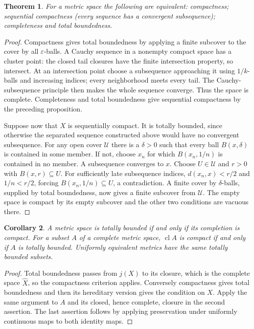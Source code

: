 \documentclass[11pt,oneside,openany]{book}
\newtheorem{theorem}{Theorem}[chapter]
\newtheorem{corollary}[theorem]{Corollary}
\theoremstyle{definition}
\theoremstyle{remark}
\newcommand{\eps}{\varepsilon}
\DeclareMathOperator{\cl}{cl}
\begin{document}
\begin{theorem}\label{d10:09:compact-equivalences}
For a metric space the following are equivalent: compactness; sequential compactness (every sequence has a convergent subsequence); completeness and total boundedness.
\end{theorem}
\begin{proof}
Compactness gives total boundedness by applying a finite subcover to the cover by all $\eps$-balls. A Cauchy sequence in a nonempty compact space has a cluster point: the closed tail closures have the finite intersection property, so intersect. At an intersection point choose a subsequence approaching it using $1/k$-balls and increasing indices; every neighborhood meets every tail. The Cauchy-subsequence principle then makes the whole sequence converge. Thus the space is complete. Completeness and total boundedness give sequential compactness by the preceding proposition.

Suppose now that $X$ is sequentially compact. It is totally bounded, since otherwise the separated sequence constructed above would have no convergent subsequence. For any open cover $\mathcal U$ there is a $\delta>0$ such that every ball $B(x,\delta)$ is contained in some member. If not, choose $x_n$ for which $B(x_n,1/n)$ is contained in no member. A subsequence converges to $x$. Choose $U\in\mathcal U$ and $r>0$ with $B(x,r)\subseteq U$. For sufficiently late subsequence indices, $d(x_n,x)<r/2$ and $1/n<r/2$, forcing $B(x_n,1/n)\subseteq U$, a contradiction. A finite cover by $\delta$-balls, supplied by total boundedness, now gives a finite subcover from $\mathcal U$. The empty space is compact by its empty subcover and the other two conditions are vacuous there.
\end{proof}

\begin{corollary}\label{d10:09:precompact-completion}
A metric space is totally bounded if and only if its completion is compact. For a subset $A$ of a complete metric space, $\cl A$ is compact if and only if $A$ is totally bounded. Uniformly equivalent metrics have the same totally bounded subsets.
\end{corollary}
\begin{proof}
Total boundedness passes from $j(X)$ to its closure, which is the complete space $\widehat X$, so the compactness criterion applies. Conversely compactness gives total boundedness and then its hereditary version gives the condition on $X$. Apply the same argument to $A$ and its closed, hence complete, closure in the second assertion. The last assertion follows by applying preservation under uniformly continuous maps to both identity maps.
\end{proof}
\end{document}
